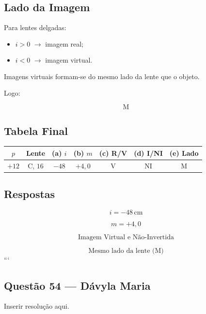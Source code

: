 \documentclass[12pt,a4paper]{article}
\begin{document}
\subsection*{Lado da Imagem}

Para lentes delgadas:

\begin{itemize}
    \item $i > 0$ $\rightarrow$ imagem real;
    \item $i < 0$ $\rightarrow$ imagem virtual.
\end{itemize}

Imagens virtuais formam-se do mesmo lado da lente que o objeto.

Logo:

\[
\boxed{\text{M}}
\]


\subsection*{Tabela Final}

\begin{center}
\begin{tabular}{ccccccc}
\hline

$p$ & Lente & (a) $i$ & (b) $m$
& (c) R/V & (d) I/NI & (e) Lado \\

\hline

$+12$ & C, $16$
& $-48$
& $+4,0$
& V
& NI
& M \\

\hline
\end{tabular}
\end{center}


\subsection*{Respostas}

\[
\boxed{
i = -48\,\text{cm}
}
\]

\[
\boxed{
m = +4,0
}
\]

\[
\boxed{
\text{Imagem Virtual e Não-Invertida}
}
\]

\[
\boxed{
\text{Mesmo lado da lente (M)}
}
\]
```


\subsection{Questão 54 — Dávyla Maria}
Inserir resolução aqui.
\end{document}
